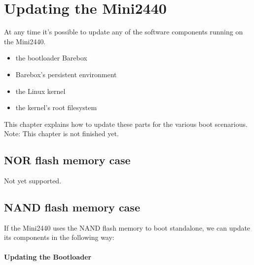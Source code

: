 %
%
%
%
%
%
%

\chapter{Updating the Mini2440}	\label{sec:updating}

At any time it's possible to update any of the software components
running on the Mini2440.

\begin{itemize}
	\item the bootloader Barebox
	\item Barebox's persistent environment
	\item the Linux kernel
	\item the kernel's root filesystem
\end{itemize}

This chapter explains how to update these parts for the various boot scenarious.
Note: This chapter is not finished yet.

\section{NOR flash memory case}

Not yet supported.

\section{NAND flash memory case}

If the Mini2440 uses the NAND flash memory to boot standalone, we can update
its components in the following way:

\subsubsection{Updating the Bootloader}

